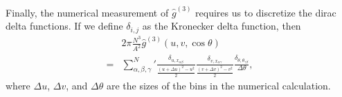 \documentclass[../main.tex]{subfiles}
\begin{document}
Finally, the numerical measurement of $\hat{g}^{(3)}$ requires us to
discretize the dirac delta functions. If we define $\delta_{i,j}$ as
the Kronecker delta function, then
\begin{align}
  &2\pi\frac{N^3}{A^2}\hat{g}^{(3)}(u,v,\cos\theta)\nonumber\\
  =&\sum_{\alpha,\beta,\gamma}^N\prime
  \frac{\delta_{u,x_{\alpha\beta}}}{\frac{(u+\Delta u)^2-u^2}{2}}
  \frac{\delta_{v,x_{\alpha\gamma}}}{\frac{(v+\Delta v)^2-v^2}{2}}
  \frac{\delta_{\theta,\theta_{\gamma\beta}}}{\Delta \theta},
\end{align}
where $\Delta u$, $\Delta v$, and $\Delta \theta$ are the sizes of the
bins in the numerical calculation.
\end{document}
